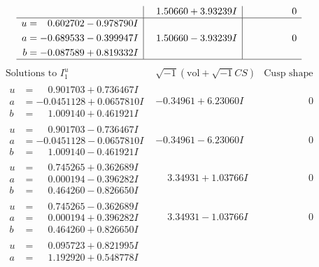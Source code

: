 \documentclass[1p]{elsarticle_modified}
\theoremstyle{definition}
\newcommand{\I}{\sqrt{-1}}
\begin{document}
$$\begin{array}{c|c|c}
 & \phantom{-}1.50660 + 3.93239 I & \phantom{-0.000000 } 0 \\ \hline\begin{aligned}
u &= \phantom{-}0.602702 - 0.978790 I \\
a &= -0.689533 - 0.399947 I \\
b &= -0.087589 + 0.819332 I\end{aligned}
 & \phantom{-}1.50660 - 3.93239 I & \phantom{-0.000000 } 0\\
 \hline 
 \end{array}$$\newpage$$\begin{array}{c|c|c}  
\text{Solutions to }I^u_{1}& \I (\text{vol} + \sqrt{-1}CS) & \text{Cusp shape}\\
 \hline 
\begin{aligned}
u &= \phantom{-}0.901703 + 0.736467 I \\
a &= -0.0451128 + 0.0657810 I \\
b &= \phantom{-}1.009140 + 0.461921 I\end{aligned}
 & -0.34961 + 6.23060 I & \phantom{-0.000000 } 0 \\ \hline\begin{aligned}
u &= \phantom{-}0.901703 - 0.736467 I \\
a &= -0.0451128 - 0.0657810 I \\
b &= \phantom{-}1.009140 - 0.461921 I\end{aligned}
 & -0.34961 - 6.23060 I & \phantom{-0.000000 } 0 \\ \hline\begin{aligned}
u &= \phantom{-}0.745265 + 0.362689 I \\
a &= \phantom{-}0.000194 - 0.396282 I \\
b &= \phantom{-}0.464260 - 0.826650 I\end{aligned}
 & \phantom{-}3.34931 + 1.03766 I & \phantom{-0.000000 } 0 \\ \hline\begin{aligned}
u &= \phantom{-}0.745265 - 0.362689 I \\
a &= \phantom{-}0.000194 + 0.396282 I \\
b &= \phantom{-}0.464260 + 0.826650 I\end{aligned}
 & \phantom{-}3.34931 - 1.03766 I & \phantom{-0.000000 } 0 \\ \hline\begin{aligned}
u &= \phantom{-}0.095723 + 0.821995 I \\
a &= \phantom{-}1.192920 + 0.548778 I \\

\end{aligned}
\end{array}$$
\end{document}
